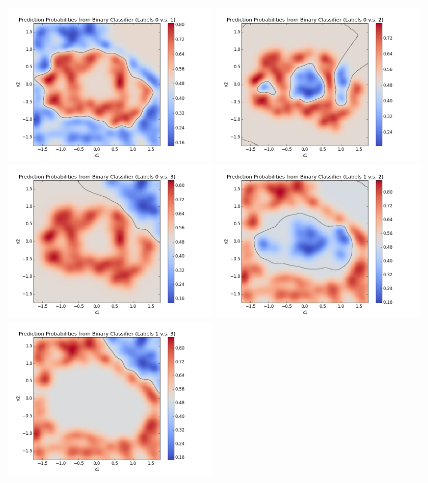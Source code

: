 				\begin{figure}[!htbp]
					\centering
						\includegraphics[width=0.48\textwidth]{Figures/Progress/exclusionAVA/Figure9.png}
						\includegraphics[width=0.48\textwidth]{Figures/Progress/exclusionAVA/Figure10.png}
						\includegraphics[width=0.48\textwidth]{Figures/Progress/exclusionAVA/Figure11.png}
						\includegraphics[width=0.48\textwidth]{Figures/Progress/exclusionAVA/Figure12.png}
						\includegraphics[width=0.48\textwidth]{Figures/Progress/exclusionAVA/Figure13.png}

\end{figure}
